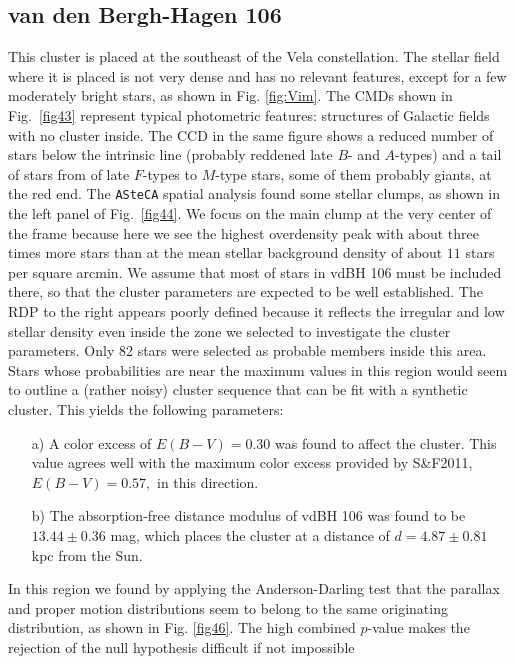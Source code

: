 \documentclass[draft]{aa}
\begin{document}
\subsection{van den Bergh-Hagen 106}

This cluster is placed at the southeast of the Vela constellation. The stellar field where it is placed is not very dense and has no relevant features, except for a few
moderately bright stars, as shown in Fig. \ref{fig:Vim}.
The CMDs shown in Fig.~\ref{fig43} represent typical photometric features:
structures of Galactic fields with no cluster inside. The CCD in the
same figure shows a reduced number of stars below the intrinsic line 
(probably reddened late $B$- and $A$-types) and a tail of stars from of late
$F$-types to $M$-type stars, some of them probably giants, at the red end.
The %
\texttt{ASteCA} spatial analysis found some stellar clumps, as shown in the left panel of
Fig.~\ref{fig44}. We focus on the main clump at the very
center of the frame because here we see the highest overdensity peak with
$\text{about three}$ times more stars than at the mean stellar background density of
$\text{about }11$ stars per square arcmin.
We assume that most of stars in vdBH 106 must be included there, so that the cluster
parameters are expected to be well established. The RDP to the right appears poorly
defined because it reflects the irregular and low stellar density even inside the
zone we selected to investigate the cluster parameters.
Only 82 stars were selected as probable members inside this area.
Stars whose probabilities are near the maximum values in this region would
seem to outline a (rather noisy) cluster sequence that can be fit with a
synthetic cluster. This yields the following parameters:

\begin{itemize}
\item [a)] A color excess of $E(B-V)=0.30$ was found to affect the
cluster. This value agrees well with the maximum color excess provided
by S\&F2011, $E(B-V)=0.57,$ in this direction.
\item [b)] The absorption-free distance modulus of vdBH 106 was found to be
$13.44\pm0.36$ mag, which places the cluster at a distance of
$d=4.87\pm0.81$ kpc from the Sun.
\end{itemize}

In this region we found by applying the Anderson-Darling test that
the parallax and proper motion distributions seem to belong to the same
originating distribution, as shown in Fig. \ref{fig46}. The
high combined $p$-value makes the rejection of the null hypothesis difficult
if not impossible\\
\end{document}

